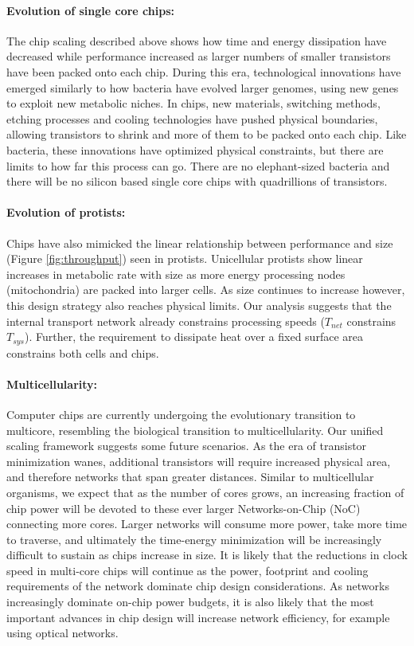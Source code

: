 \documentclass[12pt]{article}
\begin{document}
\paragraph{Evolution of single core chips:} The chip scaling described
above shows how time and energy dissipation have decreased while
performance increased as larger numbers of smaller transistors have
been packed onto each chip. During this era, technological innovations
have emerged similarly to how bacteria have evolved larger genomes,
using new genes to exploit new metabolic niches. In chips, new
materials, switching methods, etching processes and cooling
technologies have pushed physical boundaries, allowing transistors to
shrink and more of them to be packed onto each chip. Like bacteria,
these innovations have optimized physical constraints, but there are
limits to how far this process can go.  There are no elephant-sized bacteria and there will
be no silicon based single core chips with quadrillions of
transistors.

\paragraph{Evolution of protists:} Chips have also mimicked the linear relationship between performance and
size (Figure \ref{fig:throughput}) seen in protists. Unicellular protists show linear increases
in metabolic rate with size as more energy processing nodes  (mitochondria) are
packed into larger cells. As size continues to increase however, this
design strategy also reaches physical limits.  Our analysis suggests that the
internal transport network already constrains processing speeds
($T_{net}$ constrains $T_{sys}$). Further, the requirement to
dissipate heat over a fixed surface area constrains both cells and chips. 

\paragraph{Multicellularity:} Computer chips are currently undergoing
the evolutionary transition to multicore, resembling the biological
transition to multicellularity. Our unified scaling framework suggests
some future scenarios. As the era of transistor minimization wanes,
additional transistors will require increased physical area, and
therefore networks that span greater distances. Similar to
multicellular organisms, we expect that as the number of cores grows,
an increasing fraction of chip power will be devoted to these ever
larger Networks-on-Chip (NoC) connecting more cores. Larger networks
will consume more power, take more time to traverse, and ultimately
the time-energy minimization will be increasingly difficult to sustain
as chips increase in size.  It is likely that the reductions in clock
speed in multi-core chips will continue as the power, footprint and
cooling requirements of the network dominate chip design
considerations. As networks increasingly dominate on-chip power
budgets, it is also likely that the most important advances in chip
design will increase network efficiency, for example using optical
networks.
\end{document}
